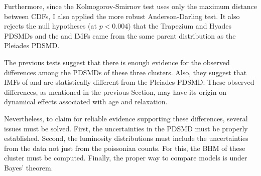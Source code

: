 Furthermore, since the Kolmogorov-Smirnov test uses only the maximum distance between CDFs, I also applied the more robust Anderson-Darling test. It also rejects the null hypotheses (at $p < 0.004$) that the Trapezium and Hyades PDSMDs and the \citet{Chabrier2005} and \citet{Thies2007} IMFs came from the same parent distribution as the Pleiades PDSMD. 

The previous tests suggest that there is enough evidence for the observed differences among the PDSMDs of these three clusters. Also, they suggest that IMFs of \citet{Chabrier2005} and \citet{Thies2007} are statistically different from the  Pleiades PDSMD.  These observed differences, as mentioned in the previous Section, may have its origin on dynamical effects associated with age and relaxation.

 Nevertheless, to claim for reliable evidence supporting these differences, several issues must be solved. First, the uncertainties in the PDSMD must be properly established. Second, the luminosity distributions must include the uncertainties from the data not just from the poissonian counts. For this, the BHM of these cluster must be computed. Finally, the proper way to compare models is under Bayes' theorem.
 




